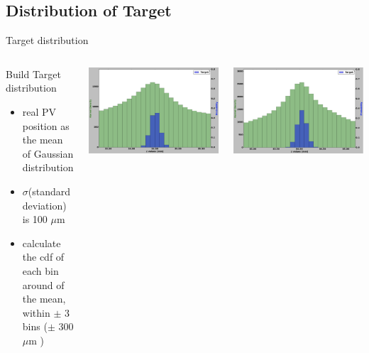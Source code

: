 \subsection{Distribution of Target}
\begin{frame}{Target distribution}
\begin{columns}[c]
    \begin{block}{Build Target distribution}
      \begin{itemize}
          \item real PV position as the mean of Gaussian distribution 
          \item $\sigma $(standard deviation) is 100 $\mu$m
          \item calculate the cdf of each bin around of the mean, within $\pm$ 3 bins ($\pm$ 300 $\mu$m )
      \end{itemize}
    \end{block}
    \begin{center}
            \includegraphics[width=1\textwidth,height=0.45\textwidth,trim=18 0 18 0]{images/T_1_12.png}
            
        \end{center}
      \begin{center}
    \includegraphics[width=1\textwidth,height=0.45\textwidth, trim=18 0 18 0]{images/T_2_12.png}
    

\end{center}
\end{columns}
\end{frame}
